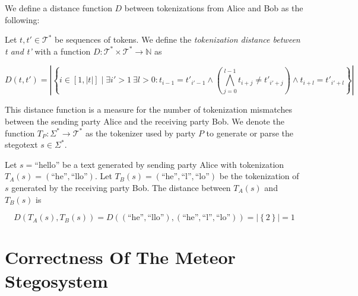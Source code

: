 We define a distance function $D$ between tokenizations from Alice and Bob as the following:

\begin{definition}
Let $t, t' \in \mathcal{T}^*$ be sequences of tokens.
We define the \emph{tokenization distance between t and t'} with a function $D \colon \mathcal{T}^* \times \mathcal{T}^* \rightarrow \mathbb{N}$ as

$$D(t, t') = \left| \left\{ i \in [1, |t|] \mid \exists i' > 1~ \exists l > 0: t_{i-1} = t'_{i'-1} \land \left( \bigwedge_{j=0}^{l-1} t_{i+j} \neq t'_{i'+j} \right) \land t_{i+l} = t'_{i'+l} \right\} \right|$$
\end{definition}

This distance function is a measure for the number of tokenization mismatches between the sending party Alice and the receiving party Bob.
We denote the function $T_P \colon \Sigma^* \rightarrow \mathcal{T}^*$ as the tokenizer used by party $P$ to generate or parse the stegotext $s \in \Sigma^*$.

\begin{example}
Let $s = \textrm{``hello''}$ be a text generated by sending party Alice with tokenization $T_A(s) = (\textrm{``he''}, \textrm{``llo''})$.
Let $T_B(s) = (\textrm{``he''}, \textrm{``l''}, \textrm{``lo''})$ be the tokenization of $s$ generated by the receiving party Bob.
The distance between $T_A(s)$ and $T_B(s)$ is 

$$
D(T_A(s), T_B(s)) 
= D( (\textrm{``he''}, \textrm{``llo''}), (\textrm{``he''}, \textrm{``l''}, \textrm{``lo''})  ) 
= \left| \left\{ 2 \right\} \right| = 1
$$
\end{example}






\section{Correctness Of The Meteor Stegosystem}

